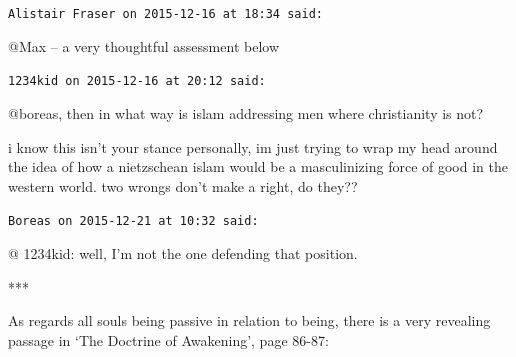\begin{footnotesize}
\begin{sffamily}
\hfill

\texttt{Alistair Fraser on 2015-12-16 at 18:34 said:}

@Max -- a very thoughtful assessment below

\hfill

\texttt{1234kid on 2015-12-16 at 20:12 said:}

@boreas, then in what way is islam addressing men where christianity is not?

i know this isn't your stance personally, im just trying to wrap my head around the idea of how a nietzschean islam would be a masculinizing force of good in the western world. two wrongs don't make a right, do they??

\hfill

\texttt{Boreas on 2015-12-21 at 10:32 said:}

@ 1234kid: well, I'm not the one defending that position.

***

As regards all souls being passive in relation to being, there is a very revealing passage in `The Doctrine of Awakening', page 86-87:


\end{sffamily}
\end{footnotesize}
